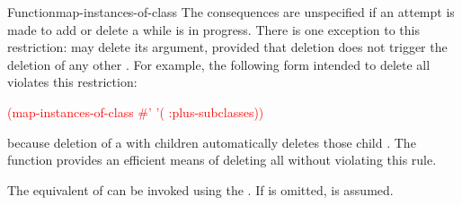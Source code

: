 \documentclass[10pt,twoside,english,pdftex]{article}
\begin{document}
\begin{functiondoc}{Function}{map-instances-of-class}
\fnnote
{}%
%
%
The consequences are unspecified if an attempt is made to add or delete a
 while  is in
progress.  There is one exception to this restriction: 
may delete its  argument, provided that deletion does not
trigger the deletion of any other .  For example, the
following form intended to delete all  violates this
restriction:
%
\W\supp
\begin{example}
   \textcolor{red}{(map-instances-of-class 
     #' 
     '( :plus-subclasses))}
\end{example}
%
because deletion of a  with children automatically
deletes those child .  The function
 provides an efficient
means of deleting all  without violating this rule.

\replnote 
%
%
%
The equivalent of 
can be invoked using the  .
If  is omitted,  is assumed.


\end{functiondoc}

\end{document}
